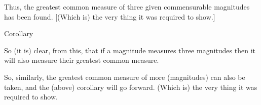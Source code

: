 \begin{Parallel}{}{}
{Thus, the greatest common measure  of three given
commensurable magnitudes has been found.  [(Which is) the very thing it was required to
show.]\\

\begin{center}
{\large Corollary}
\end{center}\vspace*{-7pt}

So (it is) clear, from this, that if a magnitude measures three
magnitudes then it will also measure their greatest common measure.

So, similarly, the greatest common measure of more (magnitudes) can also be
taken, and the (above) corollary will go forward. (Which is) the very thing
it was required to show.}
\end{Parallel}

